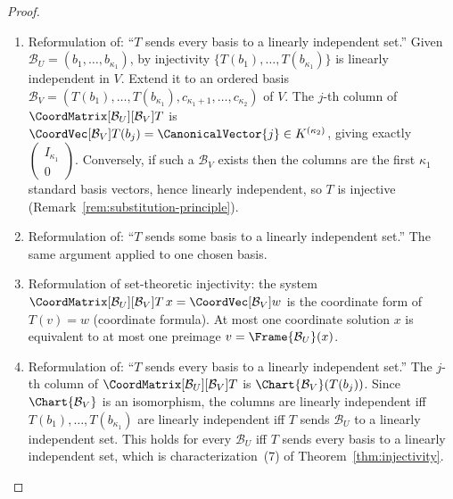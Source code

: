 \begin{proof}
    \leavevmode
    \begin{enumerate}
        \item Reformulation of: ``$T$ sends every basis to a linearly independent set.''
              Given $\mathcal{B}_U = (b_1, \ldots, b_{\kappa_1})$, by injectivity
              $\{T(b_1), \ldots, T(b_{\kappa_1})\}$ is linearly independent in $V$. Extend
              it to an ordered basis
              $\mathcal{B}_V = (T(b_1), \ldots, T(b_{\kappa_1}),
              c_{\kappa_1+1}, \ldots, c_{\kappa_2})$ of $V$.
              The $j$-th column of $\CoordMatrix[\mathcal{B}_U][\mathcal{B}_V]{T}$ is
              $\CoordVec[\mathcal{B}_V]{T(b_j)} = \CanonicalVector{j} \in K^{(\kappa_2)}$, giving exactly
              $\begin{pmatrix} I_{\kappa_1} \\ 0 \end{pmatrix}$. Conversely, if such a
              $\mathcal{B}_V$ exists then the columns are the first $\kappa_1$ standard
              basis vectors, hence linearly independent, so $T$ is injective
              (Remark~\ref{rem:substitution-principle}).

        \item Reformulation of: ``$T$ sends some basis to a linearly independent set.''
              The same argument applied to one chosen basis.

        \item Reformulation of set-theoretic injectivity: the system
              $\CoordMatrix[\mathcal{B}_U][\mathcal{B}_V]{T}\, x
              = \CoordVec[\mathcal{B}_V]{w}$
              is the coordinate form of $T(v) = w$ (coordinate formula). At most one
              coordinate solution $x$ is equivalent to at most one preimage
              $v = \Frame{\mathcal{B}_U}(x)$.

        \item Reformulation of: ``$T$ sends every basis to a linearly independent set.''
              The $j$-th column of $\CoordMatrix[\mathcal{B}_U][\mathcal{B}_V]{T}$ is
              $\Chart{\mathcal{B}_V}(T(b_j))$.
              Since $\Chart{\mathcal{B}_V}$ is an isomorphism, the columns are linearly
              independent iff $T(b_1), \ldots, T(b_{\kappa_1})$ are linearly independent
              iff $T$ sends $\mathcal{B}_U$ to a linearly independent set.
              This holds for every $\mathcal{B}_U$ iff $T$ sends every basis to a linearly
              independent set, which is characterization~(7) of
              Theorem~\ref{thm:injectivity}. \qedhere
    \end{enumerate}
\end{proof}


